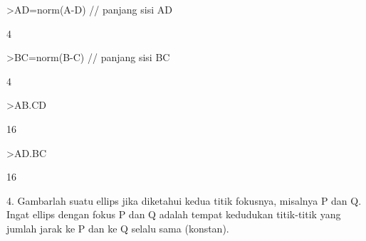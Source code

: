 \documentclass[12pt,arial,letterpaper]{book}
\begin{document}
\begin{eulernootebook}
\begin{eulercomment}
\begin{eulercomment}
\begin{eulernootebook}
\begin{eulercomment}
\begin{eulercomment}
\begin{eulercomment}
\begin{eulercomment}
\begin{eulercomment}
\begin{eulercomment}
\begin{eulernotebook}
\begin{eulercomment}
\begin{eulercomment}
\begin{eulercomment}
\begin{eulercomment}
\begin{eulercomment}
\begin{eulercomment}
\begin{eulerprompt}
>AD=norm(A-D) // panjang sisi AD
\end{eulerprompt}
\begin{euleroutput}
  4
\end{euleroutput}
\begin{eulerprompt}
>BC=norm(B-C) // panjang sisi BC
\end{eulerprompt}
\begin{euleroutput}
  4
\end{euleroutput}
\begin{eulerprompt}
>AB.CD
\end{eulerprompt}
\begin{euleroutput}
  16
\end{euleroutput}
\begin{eulerprompt}
>AD.BC
\end{eulerprompt}
\begin{euleroutput}
  16
\end{euleroutput}
\begin{eulercomment}
4. Gambarlah suatu ellips jika diketahui kedua titik fokusnya,
misalnya P dan Q. Ingat ellips dengan fokus P dan Q adalah tempat
kedudukan titik-titik yang jumlah jarak ke P dan ke Q selalu sama
(konstan).


\end{eulercomment}
\end{eulercomment}
\end{eulercomment}
\end{eulercomment}
\end{eulercomment}
\end{eulercomment}
\end{eulercomment}
\end{eulernotebook}
\end{eulercomment}
\end{eulercomment}
\end{eulercomment}
\end{eulercomment}
\end{eulercomment}
\end{eulercomment}
\end{eulernootebook}
\end{eulercomment}
\end{eulercomment}
\end{eulernootebook}
\end{document}
